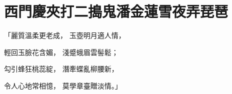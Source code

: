 %

\chapter{西門慶夾打二搗鬼\KG 潘金蓮雪夜弄琵琶}


\begin{showcontents}{}




「麗質溫柔更老成，  玉壺明月適人情，

輕回玉臉花含媚，  淺蹙蛾眉雲髻鬆；

勾引蜂狂桃蕊綻，  潛牽蝶亂柳腰新，

令人心地常相憶，  莫學章臺贈淡情。」


\end{showcontents}
